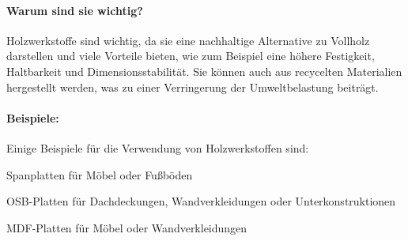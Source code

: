 \documentclass{article}
\begin{document}
\begin{multicols}{3}
\paragraph{Warum sind sie wichtig?}
Holzwerkstoffe sind wichtig, da sie eine nachhaltige Alternative zu Vollholz
darstellen und viele Vorteile bieten, wie zum Beispiel eine höhere Festigkeit,
Haltbarkeit und Dimensionsstabilität. Sie können auch aus recycelten
Materialien hergestellt werden, was zu einer Verringerung der Umweltbelastung
beiträgt.

\paragraph{Beispiele:}
Einige Beispiele für die Verwendung von Holzwerkstoffen sind:
\begin{compactitem}
  \item Spanplatten für Möbel oder Fußböden
  \item OSB-Platten für Dachdeckungen, Wandverkleidungen oder Unterkonstruktionen
  \item MDF-Platten für Möbel oder Wandverkleidungen
\end{compactitem}

\end{multicols}

\clearpage

\newpage
\pagestyle{fancy}
\fancyhf{}
\end{document}
